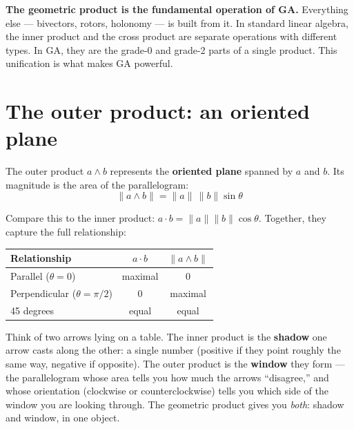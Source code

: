 \documentclass[11pt, twoside, openright]{memoir}
\newcommand{\ip}{\cdot}           %
\newcommand{\op}{\wedge}          %
\numberwithin{equation}{chapter}
\begin{document}
\begin{gabox}
\textbf{The geometric product is the fundamental operation of GA.}
Everything else --- bivectors, rotors, holonomy --- is built from it.
In standard linear algebra, the inner product and the cross product are
separate operations with different types.  In GA, they are the grade-0
and grade-2 parts of a single product.  This unification is what makes
GA powerful.
\end{gabox}

\section{The outer product: an oriented plane}

The outer product $a \op b$ represents the \textbf{oriented plane}
spanned by $a$ and $b$.  Its magnitude is the area of the parallelogram:
\begin{equation}
  \|a \op b\| = \|a\| \, \|b\| \sin\theta
\end{equation}

Compare this to the inner product: $a \ip b = \|a\|\|b\|\cos\theta$.
Together, they capture the full relationship:

\begin{center}
\renewcommand{\arraystretch}{1.4}\small
\begin{tabular}{@{}lcc@{}}
\toprule
\textbf{Relationship} & $a \ip b$ & $\|a \op b\|$ \\
\midrule
Parallel ($\theta = 0$) & maximal & 0 \\
Perpendicular ($\theta = \pi/2$) & 0 & maximal \\
45 degrees & equal & equal \\
\bottomrule
\end{tabular}
\end{center}

\begin{analogy}
Think of two arrows lying on a table.  The inner product is the
\textbf{shadow} one arrow casts along the other: a single number
(positive if they point roughly the same way, negative if opposite).
The outer product is the \textbf{window} they form --- the
parallelogram whose area tells you how much the arrows ``disagree,''
and whose orientation (clockwise or counterclockwise) tells you which
side of the window you are looking through.  The geometric product
gives you \emph{both}: shadow and window, in one object.
\end{analogy}
\end{document}
